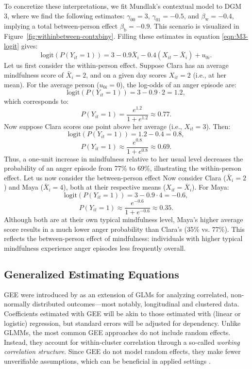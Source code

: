 To concretize these interpretations, we fit Mundlak's contextual model to DGM 3, where we find the following estimates: \( \gamma_{00} = 3 \), \( \gamma_{01} = -0.5 \), and \( \beta_\text{w} = -0.4 \), implying a total between-person effect \( \beta_\text{b} = -0.9 \). This scenario is visualized in Figure~\ref{fig:withinbetween-contxbiny}. Filling these estimates in equation \ref{eqn:M3-logit} gives:
\[
\text{logit}(P(Y_{it} = 1)) = 3 - 0.9 \bar{X}_i - 0.4 (X_{it} - \bar{X}_i) + u_{0i}.
\]
Let us first consider the within-person effect. Suppose Clara has an average mindfulness score of \( \bar{X}_i = 2 \), and on a given day scores \( X_{it} = 2 \) (i.e., at her mean). For the average person (\( u_{0i} = 0 \)), the log-odds of an anger episode are:
\[
\text{logit}(P(Y_{it} = 1)) = 3 - 0.9 \cdot 2 = 1.2,
\]
which corresponds to:
\[
P(Y_{it} = 1) = \frac{e^{1.2}}{1 + e^{1.2}} \approx 0.77.
\]
Now suppose Clara scores one point above her average (i.e., \( X_{it} = 3 \)). Then:
\[
\text{logit}(P(Y_{it} = 1)) = 1.2 - 0.4 = 0.8,
\]
\[
P(Y_{it} = 1) \approx \frac{e^{0.8}}{1 + e^{0.8}} \approx 0.69.
\]
Thus, a one-unit increase in mindfulness relative to her usual level decreases the probability of an anger episode from 77\% to 69\%, illustrating the within-person effect. Let us now consider the between-person effect Now consider Clara (\( \bar{X}_i = 2 \)) and Maya (\( \bar{X}_i = 4 \)), both at their respective means (\( X_{it} = \bar{X}_i \)). For Maya:
\[
\text{logit}(P(Y_{it} = 1)) = 3 - 0.9 \cdot 4 = -0.6,
\]
\[
P(Y_{it} = 1) \approx \frac{e^{-0.6}}{1 + e^{-0.6}} \approx 0.35.
\]
Although both are at their own typical mindfulness level, Maya’s higher average score results in a much lower anger probability than Clara’s (35\% vs. 77\%). This reflects the between-person effect of mindfulness: individuals with higher typical mindfulness experience anger episodes less frequently overall.

\subsection{Generalized Estimating Equations}

GEE were introduced by \textcite{liang_longitudinal_1986} as an extension of GLMs for analyzing correlated, non-normally distributed outcomes—most notably, longitudinal and clustered data. Coefficients estimated with GEE will be akin to those estimated with (linear or logistic) regression, but standard errors will be adjusted for dependency. Unlike GLMMs, the most common GEE approaches do not include random effects. Instead, they account for within-cluster correlation through a so-called \textit{working correlation structure}. Since GEE do not model random effects, they make fewer unverifiable assumptions, which can be beneficial in applied settings \parencite[]{mcneish_unnecessary_2017, hubbard_gee_2010}.

